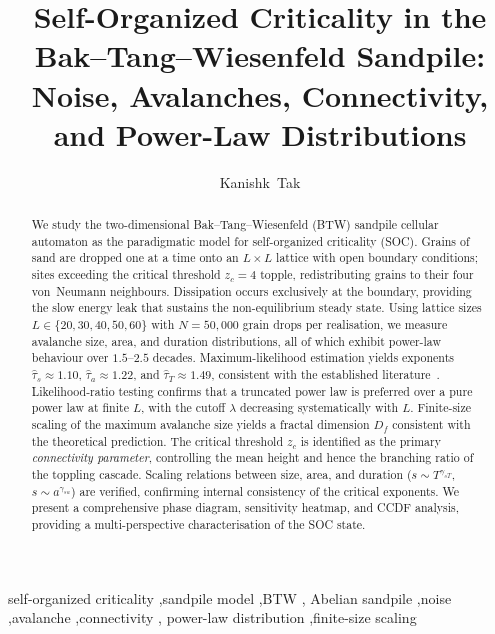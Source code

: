 \documentclass[preprint,12pt]{elsarticle}
\begin{document}
\begin{frontmatter}

\title{Self-Organized Criticality in the Bak--Tang--Wiesenfeld Sandpile:\\
       Noise, Avalanches, Connectivity, and Power-Law Distributions}

\author[inst1]{Kanishk~Tak}


\begin{abstract}
We study the two-dimensional Bak--Tang--Wiesenfeld (BTW) sandpile
cellular automaton as the paradigmatic model for self-organized
criticality (SOC).
Grains of sand are dropped one at a time onto an $L\times L$ lattice
with open boundary conditions; sites exceeding the critical threshold
$z_c=4$ topple, redistributing grains to their four von~Neumann
neighbours.
Dissipation occurs exclusively at the boundary, providing the slow
energy leak that sustains the non-equilibrium steady state.
Using lattice sizes $L\in\{20,30,40,50,60\}$ with $N=50{,}000$ grain
drops per realisation, we measure avalanche size, area, and duration
distributions, all of which exhibit power-law behaviour over $1.5$--$2.5$
decades.
Maximum-likelihood estimation yields exponents
$\hat\tau_s \approx 1.10$, $\hat\tau_a \approx 1.22$, and
$\hat\tau_T \approx 1.49$, consistent with the established
literature~\cite{Pruessner2012}.
Likelihood-ratio testing confirms that a truncated power law is
preferred over a pure power law at finite $L$, with the cutoff
$\lambda$ decreasing systematically with $L$.
Finite-size scaling of the maximum avalanche size yields a fractal
dimension $D_f$ consistent with the theoretical prediction.
The critical threshold $z_c$ is identified as the primary
\emph{connectivity parameter}, controlling the mean height and hence the
branching ratio of the toppling cascade.
Scaling relations between size, area, and duration ($s\sim T^{\gamma_{sT}}$,
$s\sim a^{\gamma_{sa}}$) are verified, confirming internal consistency
of the critical exponents.
We present a comprehensive phase diagram, sensitivity heatmap, and
CCDF analysis, providing a multi-perspective characterisation of the
SOC state.
\end{abstract}

\begin{keyword}
self-organized criticality \sep sandpile model \sep BTW \sep
Abelian sandpile \sep noise \sep avalanche \sep connectivity \sep
power-law distribution \sep finite-size scaling
\end{keyword}

\end{frontmatter}
\end{document}
